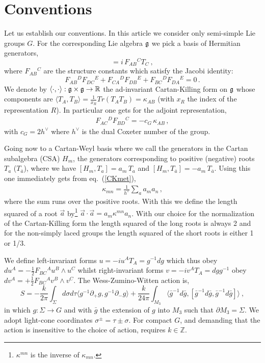 \documentclass[12pt]{article}
\def\ee{\boldsymbol{e}}
\def\be{\begin{equation}}
\def\ee{\end{equation}}
\begin{document}
\section{Conventions}\label{a0}
Let us  establish our conventions. In this article we consider only semi-simple Lie groups $G$.  For the corresponding Lie algebra $\frak{g}$ we pick a basis of Hermitian generators,
 \be
 [T_A ,T_B] = i \,F_{AB}{}^C T_C  \ ,
 \ee
 where $F_{AB}{}^C$ are the structure constants which satisfy the Jacobi identity:
  \begin{equation}
 F_{AB}{}^D F_{DC}{}^E + F_{CA}{}^D F_{DB}{}^E + F_{BC}{}^D F_{DA}{}^E = 0\,.
 \end{equation}
 We denote by  $\langle \cdot , \cdot  \rangle : \frak{g}\times \frak{g} \rightarrow \mathbb{R}$   the ad-invariant Cartan-Killing form on   $\frak{g}$ whose components are  $  \langle T_A ,T_B \rangle = \frac{1}{x_R} Tr(T_A T_B)=   \kappa_{AB}$ (with $x_R$ the index of the representation $R$).  In particular one gets for the adjoint representation,
 \begin{eqnarray}
F_{AC}{}^DF_{BD}{}^C=-c_G\, \kappa_{AB}\,,\label{CKmet}
\end{eqnarray} 
 with $c_G=2 h^\vee$ where $h^\vee$ is the dual Coxeter number of the group.
 
Going now to a Cartan-Weyl basis where we call the generators in the Cartan subalgebra (CSA) $H_m$, the generators corresponding to positive (negative) roots $T_a$ ($T_{\bar a}$), where we have $[H_m,T_a]= a_m\,T_a$ and $[H_m,T_{\bar a}]= -a_m\,T_{\bar a}$.  Using this one immediately gets from eq.~(\ref{CKmet}),
\begin{eqnarray}
\kappa_{mn}= \frac{1}{h^\vee}\sum_a a_ma_n\,,
\end{eqnarray}  
where the sum runs over the positive roots. With this we define the length squared of a root $\vec a$ by\footnote{$\kappa^{mn}$ is the inverse of $\kappa_{mn}$.} $\vec a\cdot \vec a=a_m\kappa^{mn}a_n$.  With our choice for the normalization of the Cartan-Killing form the length squared of the long roots is always 2 and for the non-simply laced groups the length squared of the short roots is either 1 or 1/3.
 
 We define left-invariant forms $u = -i u^A  T_A = g^{-1} d g$   which thus obey $du^A = -\frac{1}{2} F_{BC}{}^A u^B \wedge u^C$ whilst  right-invariant forms  $v = -i v^A  T_A =  d gg^{-1} $  obey  $dv^A = + \frac{1}{2} F_{BC}{}^A v^B \wedge v^C$. 
 The Wess-Zumino-Witten  action \cite{Witten:1983ar} is, 
   \be
  S = -\frac{k}{2\pi}\int_\Sigma  d  \sigma d\tau    \langle g^{-1} \partial_+ g , g^{-1} \partial_- g \rangle + \frac{  k}{24\pi }       \int_{M_3}     \langle   \bar g^{-1} d\bar g, [\bar g^{-1} d\bar g,\bar g^{-1} d\bar g]  \rangle \ , 
   \ee
 in which  $g:\Sigma \rightarrow G$ and with $\bar{g}$ the extension of $g$ into $M_3$ such that $\partial M_3 = \Sigma$.  We adopt light-cone coordinates      $\sigma^\pm = \tau \pm \sigma $.   For compact $G$, and demanding that the action is insensitive to the choice of action, requires $k\in \mathbb{Z}$. 
 
\end{document}
